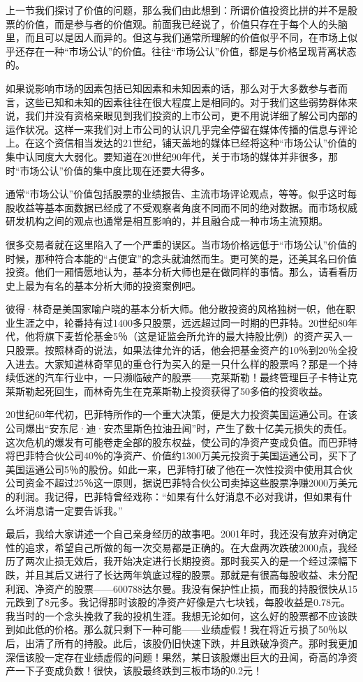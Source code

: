 上一节我们探讨了价值的问题，那么我们由此想到：所谓价值投资比拼的并不是股票的价值，而是参与者的价值观。前面我已经说了，价值只存在于每个人的头脑里，而且可以是因人而异的。但这与我们通常所理解的价值似乎不同，在市场上似乎还存在一种“市场公认”的价值。往往“市场公认”价值，都是与价格呈现背离状态的。

如果说影响市场的因素包括已知因素和未知因素的话，那么对于大多数参与者而言，这些已知和未知的因素往往在很大程度上是相同的。对于我们这些弱势群体来说，我们并没有资格亲眼见到我们投资的上市公司，更不用说详细了解公司内部的运作状况。这样一来我们对上市公司的认识几乎完全停留在媒体传播的信息与评论上。在这个资信相当发达的21世纪，铺天盖地的媒体已经将这种“市场公认”价值的集中认同度大大弱化。要知道在20世纪90年代，关于市场的媒体并非很多，那时“市场公认”价值的集中度比现在还要大得多。

通常“市场公认”价值包括股票的业绩报告、主流市场评论观点，等等。似乎这时每股收益等基本面数据已经成了不受观察者角度不同而不同的绝对数据。而市场权威研发机构之间的观点也通常是相互影响的，并且融合成一种市场主流预期。

很多交易者就在这里陷入了一个严重的误区。当市场价格远低于“市场公认”价值的时候，那种符合本能的“占便宜”的念头就油然而生。更可笑的是，还美其名曰价值投资。他们一厢情愿地认为，基本分析大师也是在做同样的事情。那么，请看看历史上最为有名的基本分析大师的投资案例吧。

彼得·林奇是美国家喻户晓的基本分析大师。他分散投资的风格独树一帜，他在职业生涯之中，轮番持有过1400多只股票，远远超过同一时期的巴菲特。20世纪80年代，他将旗下麦哲伦基金5％（这是证监会所允许的最大持股比例）的资产买入一只股票。按照林奇的说法，如果法律允许的话，他会把基金资产的10％到20％全投入进去。大家知道林奇罕见的重仓行为买入的是一只什么样的股票吗？那是一个持续低迷的汽车行业中，一只濒临破产的股票——克莱斯勒！最终管理巨子卡特让克莱斯勒起死回生，而林奇先生在克莱斯勒上投资获得了50多倍的投资收益。

20世纪60年代初，巴菲特所作的一个重大决策，便是大力投资美国运通公司。在该公司爆出“安东尼·迪·安杰里斯色拉油丑闻”时，产生了数十亿美元损失的责任。这次危机的爆发有可能卷走全部的股东权益，使公司的净资产变成负值。而巴菲特将巴菲特合伙公司40％的净资产、价值约1300万美元投资于美国运通公司，买下了美国运通公司5％的股份。如此一来，巴菲特打破了他在一次性投资中使用其合伙公司资金不超过25％这一原则，据说巴菲特合伙公司卖掉这些股票净赚2000万美元的利润。我记得，巴菲特曾经戏称：“如果有什么好消息不必对我讲，但如果有什么坏消息请一定要告诉我。”

最后，我给大家讲述一个自己亲身经历的故事吧。2001年时，我还没有放弃对确定性的追求，希望自己所做的每一次交易都是正确的。在大盘两次跌破2000点，我经历了两次止损无效后，我开始决定进行长期投资。那时我买入的是一个经过深幅下跌，并且其后又进行了长达两年筑底过程的股票。那就是有很高每股收益、未分配利润、净资产的股票——600788达尔曼。我没有保护性止损，而我的持股很快从15元跌到了8元多。我记得那时该股的净资产好像是六七块钱，每股收益是0.78元。我当时的一个念头挽救了我的投机生涯。我想无论如何，这么好的股票都不应该跌到如此低的价格。那么就只剩下一种可能——业绩虚假！我在将近亏损了50％以后，出清了所有的持股。此后，该股仍旧快速下跌，并且跌破净资产。那时我更加深信该股一定存在业绩虚假的问题！果然，某日该股爆出巨大的丑闻，奇高的净资产一下子变成负数！很快，该股最终跌到三板市场的0.2元！

